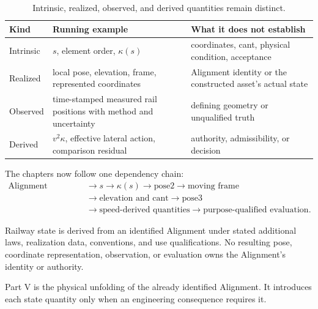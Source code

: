 \begin{table}[htbp]
\centering
\small
\begin{tabular}{p{}p{}p{}}
\toprule
\textbf{Kind} & \textbf{Running example} & \textbf{What it does not establish}\\
\midrule
Intrinsic & \(s\), element order, \(\kappa(s)\) & coordinates, cant, physical condition, acceptance\\
Realized & local pose, elevation, frame, represented coordinates & Alignment identity or the constructed asset's actual state\\
Observed & time-stamped measured rail positions with method and uncertainty & defining geometry or unqualified truth\\
Derived & \(v^2\kappa\), effective lateral action, comparison residual & authority, admissibility, or decision\\
\bottomrule
\end{tabular}
\caption{Intrinsic, realized, observed, and derived quantities remain distinct.}
\label{tab:railway-state-kinds}
\end{table}

The chapters now follow one dependency chain:
\begin{align*}
\text{Alignment identity}&\rightarrow s\rightarrow\kappa(s)
\rightarrow\mathrm{pose2}\rightarrow\text{moving frame}\\
&\rightarrow\text{elevation and cant}
\rightarrow\mathrm{pose3}\\
&\rightarrow\text{speed-derived quantities}
\rightarrow\text{purpose-qualified evaluation}.
\end{align*}

\begin{principle}
\label{princ:railway-state}
Railway state is derived from an identified Alignment under stated additional
laws, realization data, conventions, and use qualifications. No resulting
pose, coordinate representation, observation, or evaluation owns the
Alignment's identity or authority.
\end{principle}

\begin{summary}
Part V is the physical unfolding of the already identified Alignment. It
introduces each state quantity only when an engineering consequence requires
it.
\end{summary}
